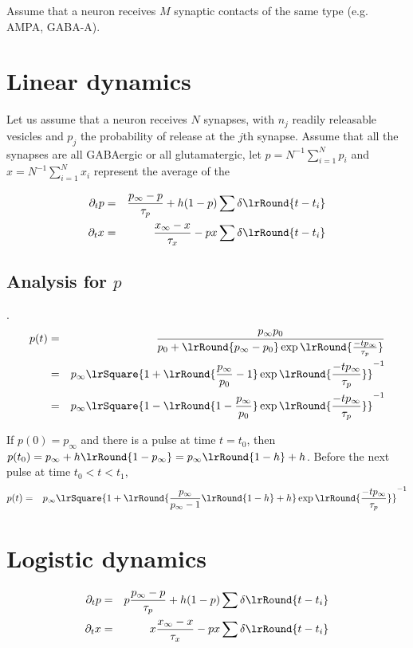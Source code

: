 \documentclass[10pt]{article}
\begin{document}
Assume that a neuron receives $M$ synaptic contacts of the same type (e.g. AMPA, GABA-A).

\section{Linear dynamics}

Let us assume that a neuron receives $N$ synapses, with $n_j$ readily releasable vesicles and $p_j$ the probability of release at the $j$th synapse.  
Assume that all the synapses are all GABAergic or all glutamatergic, let $p = N^{-1}\sum_{i=1}^N p_i$ and $x = N^{-1}\sum_{i=1}^N x_i$ represent  the average of the 

\begin{eqnarray}
\partial_t p &=&  \frac{p_{\infty} - p}{\tau_p} + h (1-p) \sum \delta\lrRound{t-t_i}
\\
\partial_t x &=&  \frac{x_{\infty} - x}{\tau_x} -  px \sum \delta\lrRound{t-t_i}
\end{eqnarray}

\subsection{Analysis for $p$}. 
\begin{eqnarray}
p (t) 
&=& \frac{p_{\infty} p_0}{p_0 + \lrRound{p_{\infty} - p_0} \exp
  \lrRound{\frac{ -t p_{\infty} }{\tau_p}} } 
\\
&=& {p_{\infty} }\lrSquare{1 + \lrRound{\frac{p_{\infty} }{p_0} -1} \exp
  \lrRound{\frac{ -t p_{\infty} }{\tau_p}} } ^{-1}
\\
&=& {p_{\infty} }\lrSquare{1 - \lrRound{1- \frac{p_{\infty} }{p_0} } \exp
  \lrRound{\frac{ -t p_{\infty} }{\tau_p}} } ^{-1}
\end{eqnarray}

If $p(0)=p_{\infty}$ and there is a pulse at time $t=t_0$, then
$p(t_0)=p_{\infty} + h \lrRound{1-p_{\infty}} 
= p_{\infty}\lrRound{1-h} + h$. Before the next pulse at time $t_0<t<t_1$, 
\begin{eqnarray}
p (t) &=& {p_{\infty} }\lrSquare{1 + \lrRound{\frac{p_{\infty} }{p_{\infty} -1} \lrRound{1-h} + h} \exp
  \lrRound{\frac{ -t p_{\infty} }{\tau_p}} } ^{-1}
\end{eqnarray}





\section{Logistic dynamics}
\begin{eqnarray}
\partial_t p &=& p \frac{p_{\infty} - p}{\tau_p} + h (1-p) \sum \delta\lrRound{t-t_i}
\\
\partial_t x &=& x \frac{x_{\infty} - x}{\tau_x} -  px \sum \delta\lrRound{t-t_i}
\end{eqnarray}
\end{document}
